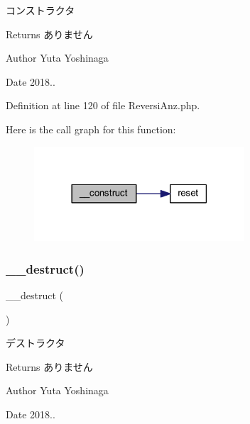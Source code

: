 コンストラクタ 

\begin{DoxyReturn}{Returns}
ありません 
\end{DoxyReturn}
\begin{DoxyAuthor}{Author}
Yuta Yoshinaga 
\end{DoxyAuthor}
\begin{DoxyDate}{Date}
2018.. 
\end{DoxyDate}


Definition at line 120 of file Reversi\+Anz.\+php.

Here is the call graph for this function\+:\nopagebreak
\begin{figure}[H]
\begin{center}
\leavevmode
\includegraphics[width=222pt]{class_reversi_anz_a095c5d389db211932136b53f25f39685_cgraph}
\end{center}
\end{figure}
\mbox{\label{class_reversi_anz_a421831a265621325e1fdd19aace0c758}} 
\subsubsection{\texorpdfstring{\+\_\+\+\_\+destruct()}{\_\_destruct()}}
{\footnotesize\ttfamily \+\_\+\+\_\+destruct (\begin{DoxyParamCaption}{ }\end{DoxyParamCaption})}



デストラクタ 

\begin{DoxyReturn}{Returns}
ありません 
\end{DoxyReturn}
\begin{DoxyAuthor}{Author}
Yuta Yoshinaga 
\end{DoxyAuthor}
\begin{DoxyDate}{Date}
2018.. 
\end{DoxyDate}


